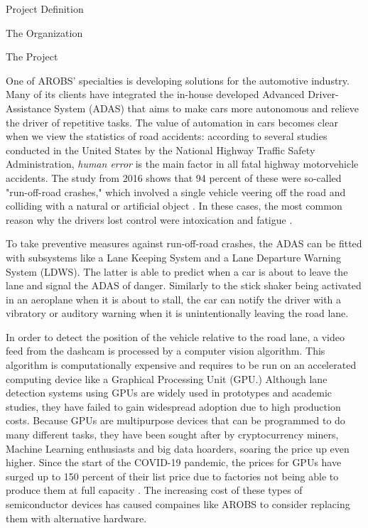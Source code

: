 \documentclass{matthijs}
\begin{document}
\begin{hoofdstuk}{Project Definition}
\begin{paragraaf}{The Organization}
		\end{paragraaf}

		\begin{paragraaf}{The Project}

			One of AROBS' specialties is developing solutions for the automotive industry.
			Many of its clients have integrated the in-house developed Advanced Driver-Assistance System (ADAS) that aims to make cars more autonomous and relieve the driver of repetitive tasks.
			The value of automation in cars becomes clear when we view the statistics of road accidents: according to several studies \cite{nhtsa2017fatal} \cite{liu2009factors} \cite{dod2011run} conducted in the United States by the National Highway Traffic Safety Administration, \textit{human error} is the main factor in all fatal highway motorvehicle accidents.
			The study from 2016 shows that 94 percent of these were so-called "run-off-road crashes," which involved a single vehicle veering off the road and colliding with a natural or artificial object \cite{nhtsa2017fatal}.
			In these cases, the most common reason why the drivers lost control were intoxication and fatigue \cite{nhtsa2017fatal}.
			
			To take preventive measures against run-off-road crashes, the ADAS can be fitted with subsystems like a Lane Keeping System and a Lane Departure Warning System (LDWS).
			The latter is able to predict when a car is about to leave the lane and signal the ADAS of danger.
			Similarly to the stick shaker being activated in an aeroplane when it is about to stall, the car can notify the driver with a vibratory or auditory warning when it is unintentionally leaving the road lane.

			In order to detect the position of the vehicle relative to the road lane, a video feed from the dashcam is processed by a computer vision algorithm.
			This algorithm is computationally expensive and requires to be run on an accelerated computing device like a Graphical Processing Unit (GPU.)
			Although lane detection systems using GPUs are widely used in prototypes and academic studies, they have failed to gain widespread adoption due to high production costs.
			Because GPUs are multipurpose devices that can be programmed to do many different tasks, they have been sought after by cryptocurrency miners, Machine Learning enthusiasts and big data hoarders, soaring the price up even higher.
			Since the start of the COVID-19 pandemic, the prices for GPUs have surged up to 150 percent of their list price due to factories not being able to produce them at full capacity \cite{cheng2021chip}.
			The increasing cost of these types of semiconductor devices has caused compaines like AROBS to consider replacing them with alternative hardware.
			

\end{paragraaf}
\end{hoofdstuk}
\end{document}

